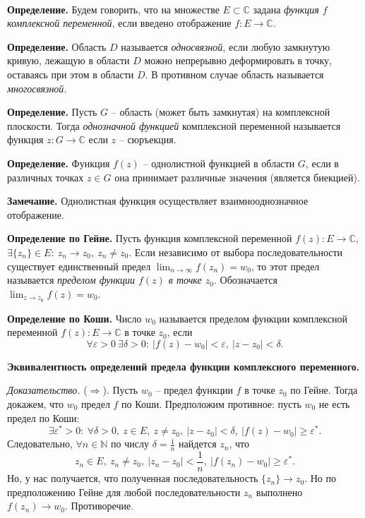 \documentclass[9pt]{article}
\begin{document}
\ 
\par\textbf{Определение.} Будем говорить, что на множестве \(E\subset \mathbb C\) задана \textit{функция \(f\) комплексной переменной}, если введено отображение \(f:E\to\mathbb C\).
\par\textbf{Определение.} Область \(D\) называется \textit{односвязной}, если любую замкнутую кривую, лежащую в области \(D\) можно непрерывно деформировать в точку, оставаясь при этом в области \(D\). В противном случае область называется \textit{многосвязной}.
\par\textbf{Определение.} Пусть \(G\) -- область (может быть замкнутая) на комплексной плоскости. Тогда \textit{однозначной функцией} комплексной переменной называется функция \(z:G\to\mathbb C\) если \(z\) -- сюръекция.
\par\textbf{Определение.} Функция \(f(z)\) -- однолистной функцией в области \(G\), если в различных точках \(z\in G\) она принимает различные значения (является биекцией).
\par\textbf{Замечание.} Однолистная функция осуществляет взаимнооднозначное отображение.
\par\textbf{Определение по Гейне.} Пусть функция комплексной переменной \(f(z):E\to\mathbb C\), \(\exists \{z_n\}\in E:\ z_n\to z_0,\ z_n\neq z_0\). Если независимо от выбора последовательности существует единственный предел \(\displaystyle\lim_{n\to\infty}f(z_n)=w_0\), то этот предел называется \textit{пределом функции \(f(z)\) в точке \(z_0\)}. Обозначается \(\displaystyle\lim_{z\to z_0}f(z)=w_0\).
\par\textbf{Определение по Коши.} Число \(w_0\) называется пределом функции комплексной переменной \(f(z):E\to\mathbb C\) в точке \(z_0\), если
\[\forall \varepsilon>0\ \exists\delta>0:\ |f(z)-w_0|<\varepsilon,\ |z-z_0|<\delta.\]
\par\textbf{Эквивалентность определений предела функции комплексного переменного.}
\par\textit{Доказательство.} (\(\Rightarrow\)). Пусть \(w_0\) -- предел функции \(f\) в точке \(z_0\) по Гейне. Тогда докажем, что \(w_0\) предел \(f\) по Коши. Предположим противное: пусть \(w_0\) не есть предел по Коши:
\[\exists \varepsilon^*>0:\ \forall \delta>0,\ z\in E,\ z\neq z_0,\ |z-z_0|<\delta,\ |f(z)-w_0|\ge\varepsilon^*.\]
Следовательно, \(\forall n\in\mathbb N\) по числу \(\delta=\frac{1}{n}\) найдется \(z_n\), что
\[z_n\in E,\ z_n\neq z_0,\ |z_n-z_0|<\dfrac{1}{n},\ |f(z_n)-w_0|\ge\varepsilon^*.\]
Но, у нас получается, что полученная последовательность \(\{z_n\}\to z_0\). Но по предположению Гейне для любой последовательности \({z_n}\) выполнено \(f(z_n)\to w_0\). Противоречие.
\end{document}
